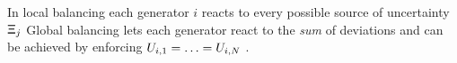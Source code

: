 \documentclass[final,3p,times,twocolumn]{elsarticle}  %
\begin{document}
In local balancing each generator $i$ reacts to every possible source of uncertainty $\mathsf{\Xi}_j$
Global balancing lets each generator react to the \emph{sum} of deviations and can be achieved by enforcing $\Gen_{i,1} = \hdots = \Gen_{i,\nbus}$ \cite{Muehlpfordt18c}.


%
\end{document}
